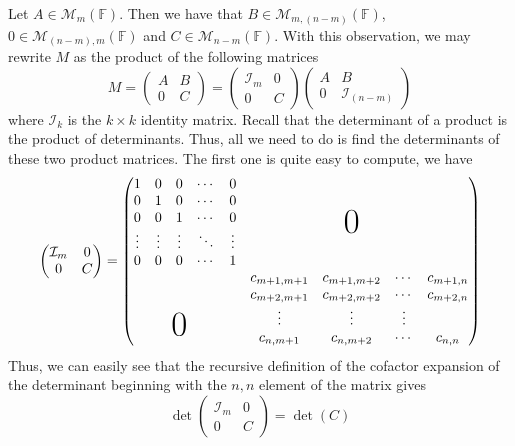 \documentclass[a4paper, 11pt]{article}
\newcommand{\F}{\mathbb{F}}
\newenvironment{solution}{%
	\begin{list}{}{%
			\setlength{\topsep}{0pt}%
			\setlength{\leftmargin}{1.5cm}%
			\setlength{\rightmargin}{1.5cm}%
			\setlength{\listparindent}{\parindent}%
			\setlength{\itemindent}{\parindent}%
			\setlength{\parsep}{\parskip}%
		}%
		\item[]}{\end{list}}
\begin{document}
\begin{solution}
  \noindent Let $A\in\mathcal{M}_m(\F)$. Then we have that $B\in\mathcal{M}_{m, (n-m)}(\F)$, $0\in\mathcal{M}_{(n-m), m}(\F)$ and $C\in\mathcal{M}_{n-m}(\F)$. With this observation, we may rewrite $M$ as the product of the following matrices
  \begin{equation*}
    M = \begin{pmatrix}A & B \\ 0 & C\end{pmatrix} = \begin{pmatrix} \mathcal{I}_m & 0 \\ 0 & C \end{pmatrix}\begin{pmatrix} A & B \\ 0 & \mathcal{I}_{(n-m)} \end{pmatrix}
  \end{equation*}
  where $\mathcal{I}_k$ is the $k\times k$ identity matrix. Recall that the determinant of a product is the product of determinants. Thus, all we need to do is find the determinants of these two product matrices. The first one is quite easy to compute, we have
  \begin{equation*}
    \begin{pmatrix} \mathcal{I}_m & 0 \\ 0 & C \end{pmatrix} = \begin{pmatrix}
      1 & 0 & 0 & \cdots & 0  \\ 
      0 & 1 & 0 & \cdots & 0  \\
      0 & 0 & 1 & \cdots & 0 & & \makebox(0,0){\text{\Huge{0}}} \\
      \vdots & \vdots & \vdots & \ddots & \vdots  \\
      0 & 0 & 0 & \cdots & 1 \\
      &   &   &  &  & c_{m+1, m+1} & c_{m+1, m+2} & \cdots & c_{m+1, n} \\
      &   &   &  &  & c_{m+2, m+1} & c_{m+2, m+2} & \cdots & c_{m+2, n} \\
      &   & \makebox(0,0){\text{\Huge{0}}} & & & \vdots & \vdots & \vdots \\
      &   &   &  &  & c_{n, m+1} & c_{n, m+2} & \cdots & c_{n,n} 
    \end{pmatrix}
  \end{equation*}
  Thus, we can easily see that the recursive definition of the cofactor expansion of the determinant beginning with the $n,n$ element of the matrix gives 
  \begin{equation*}
    \det\begin{pmatrix} \mathcal{I}_m & 0 \\ 0 & C \end{pmatrix} = \det(C)
  \end{equation*}


\end{solution}
\end{document}
